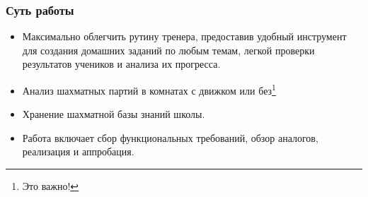\documentclass{vkr-slides-style}
\begin{document}
\makeslidestitle



\begin{frame}  
    \frametitle{Суть работы}
    \begin{itemize}

        \item Максимально облегчить рутину тренера, предоставив удобный инструмент для создания домашних заданий по любым темам, легкой проверки результатов учеников и анализа их прогресса.
        
        \item Анализ шахматных партий в комнатах с движком или без\footnote{Это важно!}
        
        \item Хранение шахматной базы знаний школы.
        
        \item Работа включает сбор функциональных требований, обзор аналогов, реализация и аппробация.
        
    \end{itemize}
\end{frame}
\end{document}
